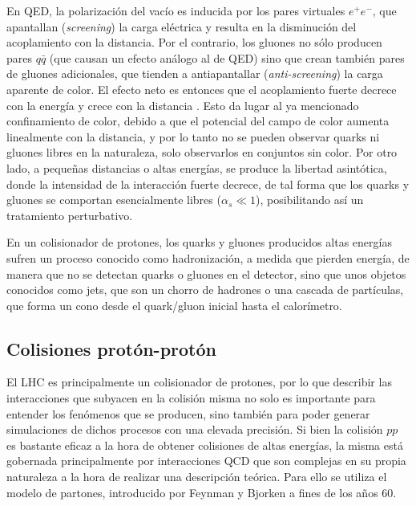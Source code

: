 En QED, la polarización del vacío es inducida por los
pares virtuales $e^{+}e^{-}$, que apantallan (\textit{screening}) la carga eléctrica y resulta en la disminución del
acoplamiento con la distancia. Por el contrario, los gluones no sólo producen pares $q\bar{q}$ (que
causan un efecto análogo al de QED) sino que crean también pares de gluones adicionales,
que tienden a antiapantallar (\textit{anti-screening}) la carga aparente de color. El efecto neto es entonces que
el acoplamiento fuerte decrece con la energía y crece con la distancia . Esto da lugar al ya mencionado confinamiento de color, debido a que el potencial del campo de color aumenta linealmente con la distancia, y por lo tanto no se pueden observar quarks ni gluones libres en la naturaleza, solo observarlos en conjuntos sin color. Por otro lado, a pequeñas distancias o altas energías, se produce la libertad asintótica, donde la intensidad de
la interacción fuerte decrece, de tal forma que los quarks y gluones se comportan
esencialmente libres ($\alpha_s \ll 1$), posibilitando así un tratamiento perturbativo. 

En un colisionador de protones, los quarks y
gluones producidos altas energías sufren un proceso conocido como hadronización,
a medida que pierden energía, de manera que no se detectan quarks o gluones en el
detector, sino que unos objetos conocidos como jets, que son un chorro de hadrones
o una cascada de partículas, que forma un cono desde el quark/gluon inicial hasta el
calorímetro. 



\subsection{Colisiones protón-protón}

El LHC es principalmente un colisionador de protones, por lo que describir las interacciones que subyacen en la colisión misma no solo es importante para entender los fenómenos que se producen, sino también para poder generar simulaciones de dichos procesos con una elevada precisión. Si bien la colisión $pp$ es bastante eficaz a la hora de obtener colisiones de altas energías, la misma está gobernada principalmente por interacciones QCD que son complejas en su propia naturaleza a la hora de realizar una descripción teórica. Para ello se utiliza el modelo de partones, introducido por Feynman \cite{feynman} y Bjorken \cite{bjorken} a fines de los años 60. 

